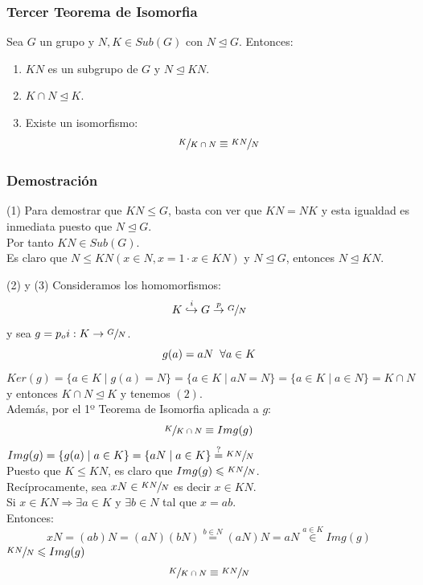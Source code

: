 \documentclass[11pt,a4paper]{article}
\begin{document}
\subsubsection*{Tercer Teorema de Isomorfia}

Sea $G$ un grupo y $N, K \in Sub(G)$ con $N \unlhd G$. Entonces:
\begin{enumerate}[label=$(\arabic*)$]
\item $KN$ es un subgrupo de $G$ y $N \unlhd KN$.
\item $K \cap N \unlhd K$.
\item Existe un isomorfismo:
$$\sfrac{K}{K \cap N} \equiv \sfrac{KN}{N}$$
\end{enumerate}

\subsubsection*{Demostración}

\begin{enumerate*}
\item[(1)] Para demostrar que $KN \leqslant G$, basta con ver que $KN = NK$ y esta igualdad es inmediata puesto que $N \unlhd G$. \\
Por tanto $KN \in Sub(G)$. \\
Es claro que $N \leqslant KN (x \in N, x = 1 \cdot x \in KN)$ y $N \unlhd G$, entonces $N \unlhd KN$.
\item[(2) y (3)] Consideramos los homomorfismos:
$$K \overset{i}{\hookrightarrow} G \overset{p}{\to} \sfrac{G}{N}$$
y sea $g = p_{o}i: K \to \sfrac{G}{N}$.
$$g(a) = aN \hspace{0.2cm} \forall a \in K$$
$Ker(g) = \{a \in K \mid g(a) = N \} = \{a \in K \mid aN = N\} = \{a \in K \mid a \in N\} = K \cap N$ \\
y entonces $K \cap N \unlhd K$ y tenemos $(2)$. \\
Además, por el 1º Teorema de Isomorfia aplicada a $g$:
$$\sfrac{K}{K \cap N} \equiv Img(g)$$
$Img(g) = \{g(a) \mid a \in K\} = \{aN \mid a \in K\} \overset{?}{=} \sfrac{KN}{N}$ \\
Puesto que $K \leqslant KN$, es claro que $Img(g) \leqslant \sfrac{KN}{N}$. \\
Recíprocamente, sea $xN \in \sfrac{KN}{N}$ es decir $x \in KN$. \\
Si $x \in KN \Rightarrow \exists a \in K$ y $\exists b \in N$ tal que $x = ab$. \\
Entonces:
$$xN = (ab)N = (aN)(bN) \overset{b \in N}{=} (aN)N = aN \overset{a \in K}{\in} Img(g)$$
$\sfrac{KN}{N} \leqslant Img(g)$
$$\sfrac{K}{K \cap N} \equiv \sfrac{KN}{N}$$ 
\end{enumerate*}
\end{document}
